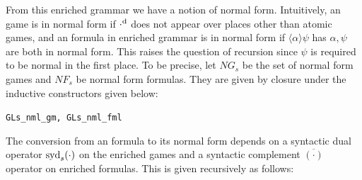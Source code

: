 From this enriched grammar we have a notion of normal form. Intuitively, an \GLs{} game is in normal form if $\cdot^\text{d}$ does not appear over places other than atomic games, and an \GLs{} formula in enriched grammar is in normal form if $\langle \alpha\rangle \psi$ has $\alpha, \psi$ are both in normal form. This raises the question of recursion since $\psi$ is required to be normal in the first place. To be precise, let $NG_s$ be the set of \GLs{} normal form games and $NF_s$ be \GLs{} normal form formulas. They are given by closure under the inductive constructors given below:

\begin{bdefinition}
\label{def:GLs_nml_gm_GLs_nml_fml}
\texttt{GLs\_nml\_gm, GLs\_nml\_fml}

\end{bdefinition}

The conversion from an \GLs{} formula to its normal form depends on a syntactic dual operator $\operatorname{syd}_s(\cdot)$ on the enriched games and a syntactic complement $\overline{(\cdot)}$ operator on enriched formulas. This is given recursively as follows:


